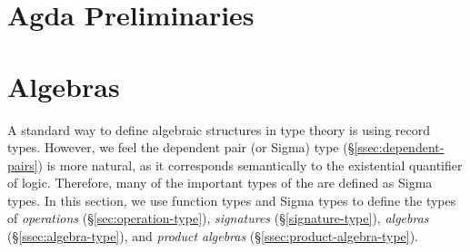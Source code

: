 \documentclass[a4paper,UKenglish,cleveref,autoref,thm-restate]{lipics-v2021}
\begin{document}
\section{Agda Preliminaries}\label{sec:agda-preliminaries}








\section{Algebras}\label{sec:types-for-algebras}
A standard way to define algebraic structures in type theory is using record types.  However, we feel the dependent pair (or Sigma) type (\S\ref{ssec:dependent-pairs}) is more natural, as it corresponds semantically to the existential quantifier of logic. Therefore, many of the important types of the \ualib are defined as Sigma types. In this section, we use function types and Sigma types to define the types of \emph{operations} (\S\ref{sec:operation-type}), \emph{signatures} (\S\ref{signature-type}), \emph{algebras} (\S\ref{ssec:algebra-type}), and \emph{product algebras} (\S\ref{ssec:product-algebra-type}).
\end{document}
